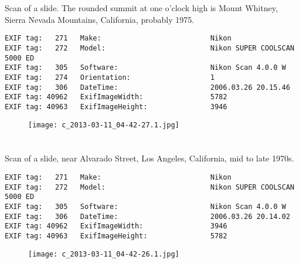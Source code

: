 \section{\protect{}}
\noindent Scan of a slide. The rounded summit at one o'clock high is Mount Whitney, Sierra Nevada Mountains, California, probably 1975.
\noindent
\begin{lstlisting}
EXIF tag:   271   Make:                          Nikon
EXIF tag:   272   Model:                         Nikon SUPER COOLSCAN 5000 ED
EXIF tag:   305   Software:                      Nikon Scan 4.0.0 W
EXIF tag:   274   Orientation:                   1
EXIF tag:   306   DateTime:                      2006.03.26 20.15.46
EXIF tag: 40962   ExifImageWidth:                5782
EXIF tag: 40963   ExifImageHeight:               3946

\end{lstlisting}
\clearpage
\begin{figure}
\raggedleft
\texttt{[image: c\_2013-03-11\_04-42-27.1.jpg]}
\end{figure}


\clearpage
\section{\protect{}}
\noindent Scan of a slide, near Alvarado Street, Los Angeles, California, mid to late 1970s.
\noindent
\begin{lstlisting}
EXIF tag:   271   Make:                          Nikon
EXIF tag:   272   Model:                         Nikon SUPER COOLSCAN 5000 ED
EXIF tag:   305   Software:                      Nikon Scan 4.0.0 W
EXIF tag:   306   DateTime:                      2006.03.26 20.14.02
EXIF tag: 40962   ExifImageWidth:                3946
EXIF tag: 40963   ExifImageHeight:               5782

\end{lstlisting}
\clearpage
\begin{figure}
\raggedleft
\texttt{[image: c\_2013-03-11\_04-42-26.1.jpg]}
\end{figure}


\clearpage
